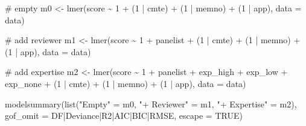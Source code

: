 \documentclass[
  letterpaper,
  DIV=11,
  numbers=noendperiod]{scrartcl}
\newenvironment{Shaded}{\begin{snugshade}}{\end{snugshade}}
\newcommand{\AttributeTok}[1]{\textcolor[rgb]{0.40,0.45,0.13}{#1}}
\newcommand{\CommentTok}[1]{\textcolor[rgb]{0.37,0.37,0.37}{#1}}
\newcommand{\ConstantTok}[1]{\textcolor[rgb]{0.56,0.35,0.01}{#1}}
\newcommand{\DecValTok}[1]{\textcolor[rgb]{0.68,0.00,0.00}{#1}}
\newcommand{\FunctionTok}[1]{\textcolor[rgb]{0.28,0.35,0.67}{#1}}
\newcommand{\NormalTok}[1]{\textcolor[rgb]{0.00,0.23,0.31}{#1}}
\newcommand{\OtherTok}[1]{\textcolor[rgb]{0.00,0.23,0.31}{#1}}
\newcommand{\SpecialCharTok}[1]{\textcolor[rgb]{0.37,0.37,0.37}{#1}}
\newcommand{\StringTok}[1]{\textcolor[rgb]{0.13,0.47,0.30}{#1}}
\begin{document}
\begin{Shaded}
\begin{Highlighting}[]
\CommentTok{\# empty}
\NormalTok{m0 }\OtherTok{\textless{}{-}} \FunctionTok{lmer}\NormalTok{(score }\SpecialCharTok{\textasciitilde{}} \DecValTok{1} \SpecialCharTok{+}\NormalTok{ (}\DecValTok{1} \SpecialCharTok{|}\NormalTok{ cmte) }\SpecialCharTok{+}\NormalTok{ (}\DecValTok{1} \SpecialCharTok{|}\NormalTok{ memno) }\SpecialCharTok{+}
\NormalTok{  (}\DecValTok{1} \SpecialCharTok{|}\NormalTok{ app), }\AttributeTok{data =}\NormalTok{ data)}

\CommentTok{\# add reviewer}
\NormalTok{m1 }\OtherTok{\textless{}{-}} \FunctionTok{lmer}\NormalTok{(score }\SpecialCharTok{\textasciitilde{}} \DecValTok{1} \SpecialCharTok{+}\NormalTok{ panelist }\SpecialCharTok{+}\NormalTok{ (}\DecValTok{1} \SpecialCharTok{|}\NormalTok{ cmte) }\SpecialCharTok{+} 
\NormalTok{  (}\DecValTok{1} \SpecialCharTok{|}\NormalTok{ memno) }\SpecialCharTok{+}\NormalTok{ (}\DecValTok{1} \SpecialCharTok{|}\NormalTok{ app), }\AttributeTok{data =}\NormalTok{ data)}

\CommentTok{\# add expertise}
\NormalTok{m2 }\OtherTok{\textless{}{-}} \FunctionTok{lmer}\NormalTok{(score }\SpecialCharTok{\textasciitilde{}} \DecValTok{1} \SpecialCharTok{+}\NormalTok{ panelist }\SpecialCharTok{+}\NormalTok{ exp\_high }\SpecialCharTok{+}\NormalTok{ exp\_low }\SpecialCharTok{+}
\NormalTok{  exp\_none }\SpecialCharTok{+}\NormalTok{ (}\DecValTok{1} \SpecialCharTok{|}\NormalTok{ cmte) }\SpecialCharTok{+}\NormalTok{ (}\DecValTok{1} \SpecialCharTok{|}\NormalTok{ memno) }\SpecialCharTok{+}\NormalTok{ (}\DecValTok{1} \SpecialCharTok{|}\NormalTok{ app), }
  \AttributeTok{data =}\NormalTok{ data)}

\FunctionTok{modelsummary}\NormalTok{(}\FunctionTok{list}\NormalTok{(}\StringTok{"Empty"} \OtherTok{=}\NormalTok{ m0, }
  \StringTok{"+ Reviewer"} \OtherTok{=}\NormalTok{ m1, }\StringTok{"+ Expertise"} \OtherTok{=}\NormalTok{ m2),}
  \AttributeTok{gof\_omit =} \StringTok{\textquotesingle{}DF|Deviance|R2|AIC|BIC|RMSE\textquotesingle{}}\NormalTok{,}
  \AttributeTok{escape =} \ConstantTok{TRUE}\NormalTok{)}
\end{Highlighting}
\end{Shaded}
\end{document}
